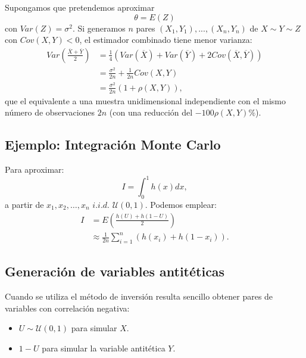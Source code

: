 \documentclass[]{book}
\theoremstyle{definition}
\theoremstyle{definition}
\theoremstyle{definition}
\theoremstyle{remark}
\begin{document}
Supongamos que pretendemos aproximar \[\theta=E\left(  Z\right)\] con
\(Var\left( Z \right) = \sigma^{2}\). Si generamos \(n\) pares
\(\left( X_{1},Y_{1}\right), ... ,\left( X_{n},Y_{n}\right)\) de
\(X\sim Y\sim Z\) con \(Cov\left( X,Y\right) < 0\), el estimador
combinado tiene menor varianza: \[\begin{aligned}
    Var\left(  \frac{\overline{X}+\overline{Y}}{2}\right)   & =\frac{1}{4}\left(
    Var\left(  \overline{X}\right)  +Var\left(  \overline{Y}\right)  +2Cov\left(
    \overline{X},\overline{Y}\right)  \right) \\
    & =\frac{\sigma^{2}}{2n}+\frac{1}{2n}Cov\left(  X,Y\right) \\
    & =\frac{\sigma^{2}}{2n}\left(  1+\rho \left(  X,Y\right)  \right),
\end{aligned}\] que el equivalente a una muestra unidimensional
independiente con el mismo número de observaciones \(2n\) (con una
reducción del \(-100\rho \left( X,Y\right) \%\)).

\subsection{Ejemplo: Integración Monte
Carlo}\label{ejemplo-integracion-monte-carlo}

Para aproximar: \[I=\int_{0}^{1}h\left(  x\right) dx,\] a partir de
\(x_{1},x_{2},\ldots,x_{n}\) \(i.i.d.\) \(\mathcal{U}\left(0,1\right)\).
Podemos emplear: \[\begin{aligned}
    I  & =E\left(  \frac{h\left(  U\right)  +h\left(  1-U\right)  }{2}\right) \\
    & \approx \frac{1}{2n}\sum \limits_{i=1}^{n}\left(  h\left(  x_{i}\right)
    +h\left(  1-x_{i}\right)  \right).
\end{aligned}\]

\subsection{Generación de variables
antitéticas}\label{generacion-de-variables-antiteticas}

Cuando se utiliza el método de inversión resulta sencillo obtener pares
de variables con correlación negativa:

\begin{itemize}
\item
  \(U\sim \mathcal{U}\left( 0,1\right)\) para simular \(X\).
\item
  \(1-U\) para simular la variable antitética \(Y\).
\end{itemize}
\end{document}
